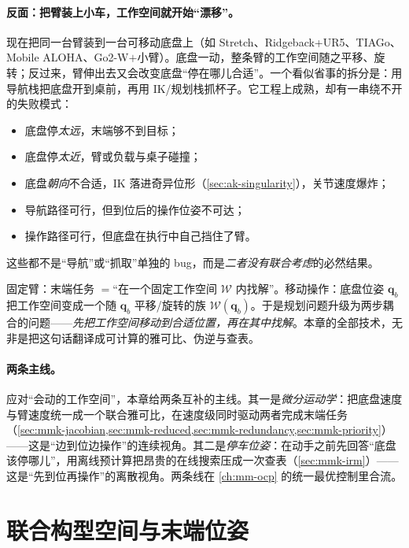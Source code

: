 \paragraph{反面：把臂装上小车，工作空间就开始“漂移”。}
现在把同一台臂装到一台可移动底盘上（如 Stretch、Ridgeback+UR5、TIAGo、Mobile ALOHA、Go2-W$+$小臂）。底盘一动，整条臂的工作空间随之平移、旋转；反过来，臂伸出去又会改变底盘“停在哪儿合适”。一个看似省事的拆分是：用导航栈把底盘开到桌前，再用 IK/规划栈抓杯子。它工程上成熟，却有一串绕不开的失败模式：
\begin{itemize}
  \item 底盘停\emph{太远}，末端够不到目标；
  \item 底盘停\emph{太近}，臂或负载与桌子碰撞；
  \item 底盘\emph{朝向}不合适，IK 落进奇异位形（\cref{sec:ak-singularity}），关节速度爆炸；
  \item 导航路径可行，但到位后的操作位姿不可达；
  \item 操作路径可行，但底盘在执行中自己挡住了臂。
\end{itemize}
这些都不是“导航”或“抓取”单独的 bug，而是\emph{二者没有联合考虑}的必然结果。

\begin{insight}
固定臂：末端任务 $=$“在一个固定工作空间 $\mathcal{W}$ 内找解”。移动操作：底盘位姿 $\mathbf{q}_b$ 把工作空间变成一个随 $\mathbf{q}_b$ 平移/旋转的族 $\mathcal{W}(\mathbf{q}_b)$。于是规划问题升级为两步耦合的问题——\emph{先把工作空间移动到合适位置，再在其中找解}。本章的全部技术，无非是把这句话翻译成可计算的雅可比、伪逆与查表。
\end{insight}

\paragraph{两条主线。}
应对“会动的工作空间”，本章给两条互补的主线。其一是\emph{微分运动学}：把底盘速度与臂速度统一成一个联合雅可比，在速度级同时驱动两者完成末端任务（\cref{sec:mmk-jacobian,sec:mmk-reduced,sec:mmk-redundancy,sec:mmk-priority}）——这是“边到位边操作”的连续视角。其二是\emph{停车位姿}：在动手之前先回答“底盘该停哪儿”，用离线预计算把昂贵的在线搜索压成一次查表（\cref{sec:mmk-irm}）——这是“先到位再操作”的离散视角。两条线在 \cref{ch:mm-ocp} 的统一最优控制里合流。

\section{联合构型空间与末端位姿}
\label{sec:mmk-config}

